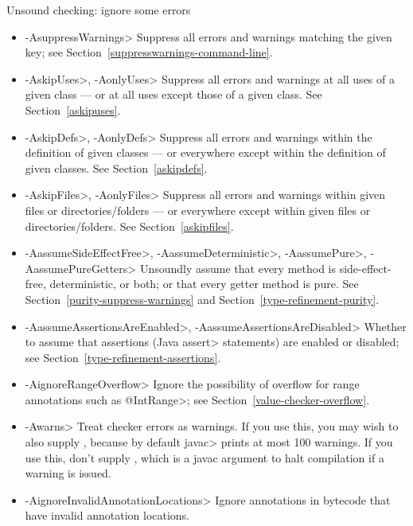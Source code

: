 Unsound checking: ignore some errors
\begin{itemize}
\item \<-AsuppressWarnings>
  Suppress all errors and warnings matching the given key; see
  Section~\ref{suppresswarnings-command-line}.
\item \<-AskipUses>, \<-AonlyUses>
  Suppress all errors and warnings at all uses of a given class --- or at all
  uses except those of a given class.  See Section~\ref{askipuses}.
\item \<-AskipDefs>, \<-AonlyDefs>
  Suppress all errors and warnings within the definition of given classes
  --- or everywhere except within the definition of given classes.  See
  Section~\ref{askipdefs}.
\item \<-AskipFiles>, \<-AonlyFiles>
  Suppress all errors and warnings within given files or directories/folders
  --- or everywhere except within given files or directories/folders.  See
  Section~\ref{askipfiles}.
\item \<-AassumeSideEffectFree>, \<-AassumeDeterministic>, \<-AassumePure>, \<-AassumePureGetters>
  Unsoundly assume that every method is side-effect-free, deterministic, or
  both; or that every getter method is pure.
  See Section~\ref{purity-suppress-warnings} and
  Section~\ref{type-refinement-purity}.
\item \<-AassumeAssertionsAreEnabled>, \<-AassumeAssertionsAreDisabled>
  Whether to assume that assertions (Java \<assert> statements) are enabled
  or disabled; see Section~\ref{type-refinement-assertions}.
\item \<-AignoreRangeOverflow>
  Ignore the possibility of overflow for range annotations such as
  \<@IntRange>; see Section~\ref{value-checker-overflow}.
\item \<-Awarns>
  Treat checker errors as warnings.  If you use this, you may wish to also
  supply , because by default \<javac> prints at
  most 100 warnings.  If you use this, don't supply ,
  which is a javac argument to halt compilation if a warning is issued.
\item \<-AignoreInvalidAnnotationLocations>
  Ignore annotations in bytecode that have invalid annotation locations.
\end{itemize}

